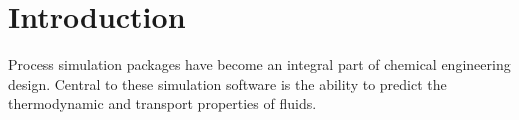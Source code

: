 \documentclass[12pt]{UoAthesis}
\begin{document}
%
%




\chapter{Introduction}

Process simulation packages have become an integral part of chemical
engineering design.  Central to these simulation software is the
ability to predict the thermodynamic and transport properties of fluids.
\end{document}
